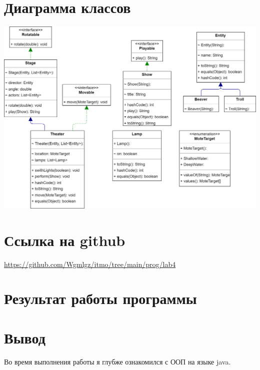\documentclass{article}
\begin{document}
\section{Диаграмма классов}

\begin{center}
  \includegraphics[scale=0.2]{diagram.png}
\end{center}

\section{Ссылка на github}
\url{https://github.com/Wgmlgz/itmo/tree/main/prog/lab4}
\section{Результат работы программы}
\section{Вывод}
Во время выполнения работы я глубже ознакомился с ООП на языке java.
\end{document}
